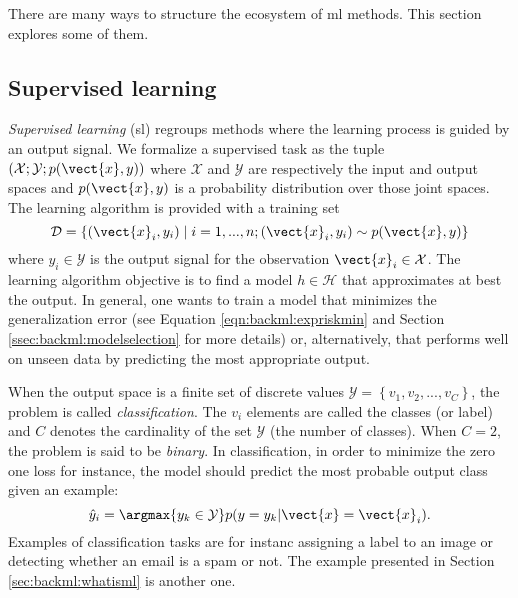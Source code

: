 There are many ways to structure the ecosystem of \acrlong{ml} methods. This
section explores some of them.

\subsection{Supervised learning}
\label{ssec:backml:sl}

\textit{Supervised learning} (\acrshort{sl}) regroups methods where the learning
process is guided by an output signal. We formalize a supervised task as the tuple
$\left(\mathcal{X}; \mathcal{Y}; p(\vect{x}, y)\right)$ where $\mathcal{X}$ and
$\mathcal{Y}$ are respectively the input and output spaces and $p(\vect{x}, y)$
is a probability distribution over those joint spaces. The learning algorithm is
provided with a training set
\begin{equation}
\label{eqn:backml:supervised}
\mathcal{D} = \left\{(\vect{x}_i, y_i) \mid i = 1,...,n ; (\vect{x}_i, y_i) \sim p(\vect{x}, y) \right\}
\end{equation}
where $y_i \in \mathcal{Y}$ is the output signal for the observation
$\vect{x}_i \in \mathcal{X}$. The learning algorithm objective is to find a model
$h \in \mathcal{H}$ that approximates at best the output. In general, one wants to train 
a model that minimizes the generalization error (see Equation \ref{eqn:backml:expriskmin} and 
Section \ref{ssec:backml:modelselection} for more details) or, alternatively, that 
performs well on unseen data by predicting the most appropriate output.

When the output space is a finite set of discrete values
$\mathcal{Y} = \left\{v_1, v_2, ..., v_C\right\}$, the problem is called
\textit{classification}. The $v_i$ elements are called the classes (or label) and
$C$ denotes the cardinality of the set $\mathcal{Y}$ (\ie the number of classes).
When $C = 2$, the problem is said to be \textit{binary}. In classification, in order to 
minimize the zero one loss for instance, the model should predict the most probable 
output class given an example:
\begin{equation}
\hat{y}_i = \argmax{y_k \in \mathcal{Y}} p(y=y_k|\vect{x}=\vect{x}_i).
\end{equation}
Examples of classification tasks are for instanc assigning a label to an image
or detecting whether an email is a spam or not. The example presented in Section 
\ref{sec:backml:whatisml} is another one.

